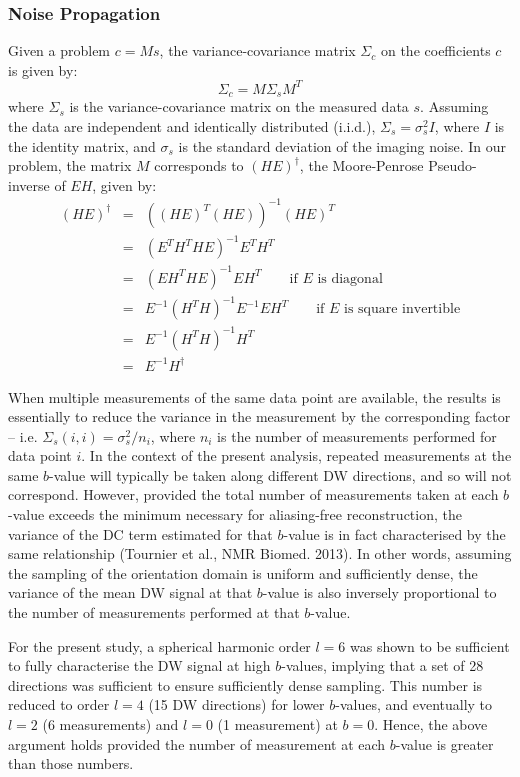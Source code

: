 \documentclass{article}
\begin{document}
\subsubsection{Noise Propagation}
Given a problem $c = M s$, the variance-covariance matrix $\Sigma_c$ on the coefficients $c$ is given by:
\begin{equation}
\label{noise_prop}
\Sigma_c = M \Sigma_s M^T 
\end{equation}
where $\Sigma_s$ is the variance-covariance matrix on the measured data $s$.  
Assuming the data are independent and identically distributed (i.i.d.),
$\Sigma_s = \sigma_s^2 I$, where $I$ is the identity matrix, and $\sigma_s$ is
the standard deviation of the imaging noise. In our problem, the matrix $M$
corresponds to $(HE)^\dagger$, the Moore-Penrose Pseudo-inverse of $EH$, given by:
\begin{eqnarray}
(HE)^\dagger & = & \left( (HE)^T(HE) \right)^{-1}(HE)^T \\
& = & \left(E^T H^T H E \right)^{-1} E^T H^T\\
& = & (E H^T H E)^{-1} E H^T \qquad \textrm{if $E$ is diagonal} \\
& = & E^{-1} (H^TH)^{-1} E^{-1} E H^T \qquad \textrm{if $E$ is square invertible} \\
& = & E^{-1} (H^T H)^{-1} H^T \\
& = & E^{-1} H^\dagger
\end{eqnarray}

When multiple measurements of the same data point are available, the results is
essentially to reduce the variance in the measurement by the corresponding
factor -- i.e. $\Sigma_s(i,i) = \sigma_s^2 / n_i$, where $n_i$ is the number of
measurements performed for data point $i$. In the context of the present
analysis, repeated measurements at the same $b$-value will typically be taken
along different DW directions, and so will not correspond. However, provided
the total number of measurements taken at each $b$-value exceeds the minimum
necessary for aliasing-free reconstruction, the variance of the DC term
estimated for that $b$-value is in fact characterised by the same relationship
(Tournier et al., NMR Biomed. 2013). In other words, assuming the sampling of
the orientation domain is uniform and sufficiently dense, the variance of the
mean DW signal at that $b$-value is also inversely proportional to the
number of measurements performed at that $b$-value. 

For the present study, a spherical harmonic order $l = 6$ was shown to be
sufficient to fully characterise the DW signal at high $b$-values, implying
that a set of 28 directions was sufficient to ensure sufficiently dense
sampling. This number is reduced to order $l=4$ (15 DW directions) for lower
$b$-values, and eventually to $l=2$ (6 measurements) and $l=0$ (1 measurement)
at $b=0$. Hence, the above argument holds provided the number of measurement at
each $b$-value is greater than those numbers. 
\end{document}
